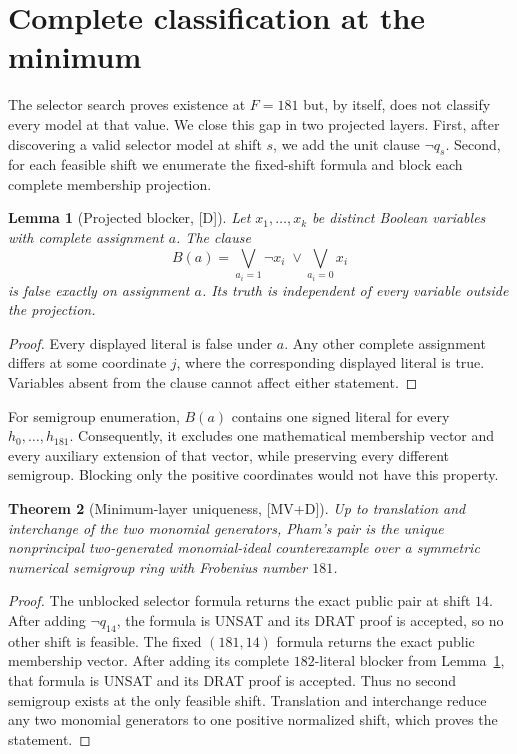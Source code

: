 \documentclass[11pt]{article}
\newtheorem{theorem}{Theorem}[section]
\newtheorem{lemma}[theorem]{Lemma}
\theoremstyle{definition}
\theoremstyle{remark}
\begin{document}
\section{Complete classification at the minimum}

The selector search proves existence at $F=181$ but, by itself, does not classify every model at
that value. We close this gap in two projected layers. First, after discovering a valid selector
model at shift $s$, we add the unit clause $\neg q_s$. Second, for each feasible shift we enumerate
the fixed-shift formula and block each complete membership projection.

\begin{lemma}[Projected blocker, {[D]}]\label{lem:blocker}
Let $x_1,\ldots,x_k$ be distinct Boolean variables with complete assignment $a$. The clause
\[
 B(a)=\bigvee_{a_i=1}\neg x_i\;\lor\!\bigvee_{a_i=0}x_i
\]
is false exactly on assignment $a$. Its truth is independent of every variable outside the
projection.
\end{lemma}
\begin{proof}
Every displayed literal is false under $a$. Any other complete assignment differs at some
coordinate $j$, where the corresponding displayed literal is true. Variables absent from the
clause cannot affect either statement.
\end{proof}

For semigroup enumeration, $B(a)$ contains one signed literal for every
$h_0,\ldots,h_{181}$. Consequently, it excludes one mathematical membership vector and every
auxiliary extension of that vector, while preserving every different semigroup. Blocking only the
positive coordinates would not have this property.

\begin{theorem}[Minimum-layer uniqueness, {[MV+D]}]\label{thm:unique}
Up to translation and interchange of the two monomial generators, Pham's pair is the unique
nonprincipal two-generated monomial-ideal counterexample over a symmetric numerical semigroup ring
with Frobenius number $181$.
\end{theorem}
\begin{proof}
The unblocked selector formula returns the exact public pair at shift $14$. After adding
$\neg q_{14}$, the formula is UNSAT and its DRAT proof is accepted, so no other shift is feasible.
The fixed $(181,14)$ formula returns the exact public membership vector. After adding its complete
$182$-literal blocker from Lemma~\ref{lem:blocker}, that formula is UNSAT and its DRAT proof is
accepted. Thus no second semigroup exists at the only feasible shift. Translation and interchange
reduce any two monomial generators to one positive normalized shift, which proves the statement.
\end{proof}
\end{document}
